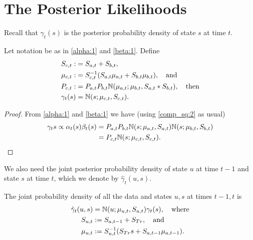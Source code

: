 \documentclass[12pt,leqno]{article}
\begin{document}
\section{The Posterior Likelihoods}
Recall that $\gamma_t(s)$ is the posterior probability density of state $s$
at time $t$. 
\begin{Thm}
  Let notation be as in \eqref{alpha:1} and \eqref{beta:1}.  Define
\begin{align*}
  S_{c,t} :&= S_{a,t} + S_{b,t}, \\
  \mu_{c,t} :&= S_{c,t}^{-1}(S_{a,t}\mu_{a,t} + S_{b,t}\mu_{b,t}), \quad\text{and}\\
  P_{c,t} :&= P_{a,t}P_{b,t}{\mathbb N}(\mu_{a,t};\mu_{b,t},S_{a,t}*S_{b,t}), \quad\text{then} \\
 \gamma_t(s) &= {\mathbb N}(s;\mu_{c,t},S_{c,t}).
  \end{align*}
\end{Thm}
\begin{proof}
  From \eqref{alpha:1} and \eqref{beta:1} we have (using \eqref{comp_sq:2}
  as usual)
  \begin{align*}
  \gamma_t{s} \propto \alpha_t(s)\beta_t(s) &= P_{a,t}P_{b,t}{\mathbb N}(s;\mu_{a,t},S_{a,t}){\mathbb N}(s;\mu_{b,t},S_{b,t})\\
  &= P_{c,t}{\mathbb N}(s;\mu_{c,t},S_{c,t}).
  \end{align*}
\end{proof}

We also need the joint posterior probability density of state $u$ at time $t-1$ and state $s$ at time $t$,
which we denote by $\hat{\gamma}_t(u,s)$.
\begin{Lem}\label{gamma_hat}
The joint probability density of all the data and states $u,s$  at times $t-1,t$ is
\begin{align*}
  \hat{\gamma}_t(u,s) &= {\mathbb N}(u;\mu_{u,t},S_{u,t})\gamma_t(s), \quad\text{where} \\
  S_{u,t} &:= S_{a,t-1}+S_{Tr},\quad\text{and}\\
  \mu_{u,t} &:= S_{u,t}^{-1}(S_{Tr}s + S_{a,t-1}\mu_{a,t-1}).
\end{align*}
\end{Lem}
\end{document}
